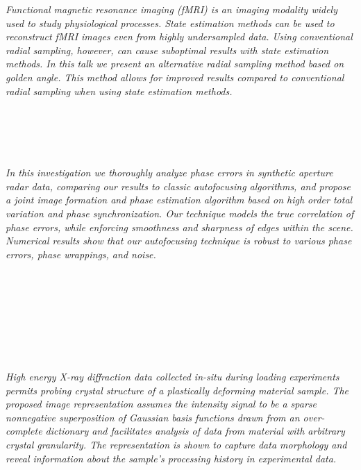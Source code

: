   \begin{multicols}{2}
    \textit{Functional magnetic resonance imaging (fMRI) is an imaging modality widely used to study physiological processes. State estimation methods can be used to reconstruct fMRI images even from highly undersampled data. Using conventional radial sampling, however, can cause suboptimal results with state estimation methods. In this talk we present an alternative radial sampling method based on golden angle. This method allows for improved results compared to conventional radial sampling when using state estimation methods. }\\
\\ 
      \\
      \\\\
\\
    \textit{In this investigation we thoroughly analyze phase errors in synthetic aperture radar data, comparing our results to classic autofocusing algorithms, and propose a joint image formation and phase estimation algorithm based on high order total variation and phase synchronization. Our technique models the true correlation of phase errors, while enforcing smoothness and sharpness of edges within the scene. Numerical results show that our autofocusing technique is robust to various phase errors, phase wrappings, and noise. }\\
\\ 
      \\
      \\\\
      \\
      \\\\
\\
    \textit{High energy X-ray diffraction data collected in-situ during loading experiments permits probing crystal structure of a plastically deforming material sample. The proposed image representation assumes the intensity signal to be a sparse nonnegative superposition of Gaussian basis functions drawn from an over-complete dictionary and facilitates analysis of data from material with arbitrary crystal granularity. The representation is shown to capture data morphology and reveal information about the sample’s processing history in experimental data.}\\
\\ 

\end{multicols}
